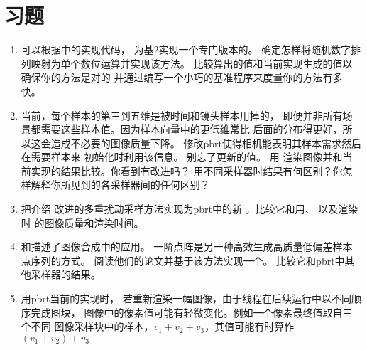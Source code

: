 \section{习题}\label{sec:习题07}
\begin{enumerate}
      \item \circletwo 可以根据中的实现代码，
            为基2实现一个专门版本的。
            确定怎样将随机数字排列映射为单个数位运算并实现该方法。
            比较算出的值和当前实现生成的值以确保你的方法是对的
            并通过编写一个小巧的基准程序来度量你的方法有多快。
      \item \circletwo 当前，每个样本的第三到五维是被时间和镜头样本用掉的，
            即便并非所有场景都需要这些样本值。因为样本向量中的更低维常比
            后面的分布得更好，所以这会造成不必要的图像质量下降。
            修改pbrt使得相机能表明其样本需求然后在需要样本来
            初始化时利用该信息。
            别忘了更新的值。
            用
            渲染图像并和当前实现的结果比较。你看到有改进吗？
            用不同采样器时结果有何区别？你怎样解释你所见到的各采样器间的任何区别？
      \item \label{sub:7.11.3}\circletwo 把\citet{Kensler2013Pixar}介绍
            改进的多重扰动采样方法实现为pbrt中的新
            。比较它和用、
            以及渲染时
            的图像质量和渲染时间。
      \item \circletwo\citet{10.1007/3-540-31186-6_14}
            和\citet{10.1007/978-3-540-74496-2_12}描述了图像合成中的应用。
            一阶点阵是另一种高效生成高质量低偏差样本点序列的方式。
            阅读他们的论文并基于该方法实现一个。
            比较它和pbrt中其他采样器的结果。
      \item \circletwo 用pbrt当前的实现时，
            若重新渲染一幅图像，由于线程在后续运行中以不同顺序完成图块，
            图像中的像素值可能有轻微变化。例如一个像素最终值取自三个不同
            图像采样块中的样本，$v_1+v_2+v_3$，其值可能有时算作$(v_1+v_2)+v_3$

\end{enumerate}
